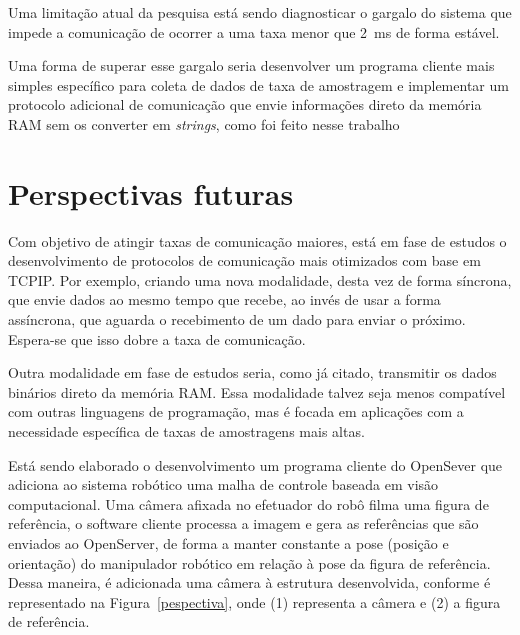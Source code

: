     Uma limitação atual da pesquisa está sendo diagnosticar o gargalo do sistema que impede a comunicação de ocorrer a uma taxa menor que \SI{2}{\milli\second} de forma estável.
    
    Uma forma de superar esse gargalo seria desenvolver um programa cliente mais simples específico para coleta de dados de taxa de amostragem e implementar um protocolo adicional de comunicação que envie informações direto da memória RAM sem os converter em \textit{strings}, como foi feito nesse trabalho
    
    \section{Perspectivas futuras}
        
        Com objetivo de atingir taxas de comunicação maiores, está em fase de estudos o desenvolvimento de protocolos de comunicação mais otimizados com base em \ac{TCPIP}. Por exemplo, criando uma nova modalidade, desta vez de forma síncrona, que envie dados ao mesmo tempo que recebe, ao invés de usar a forma assíncrona, que aguarda o recebimento de um dado para enviar o próximo. Espera-se que isso dobre a taxa de comunicação.
        
        Outra modalidade em fase de estudos seria, como já citado, transmitir os dados binários direto da memória RAM. Essa modalidade talvez seja menos compatível com outras linguagens de programação, mas é focada em aplicações com a necessidade específica de taxas de amostragens mais altas. 
        
        Está sendo elaborado o desenvolvimento um programa cliente do OpenSever que adiciona ao sistema robótico uma malha de controle baseada em visão computacional. Uma câmera afixada no efetuador do robô filma uma figura de referência, o software cliente processa a imagem e gera as referências que são enviados ao OpenServer, de forma a manter constante a pose (posição e orientação) do manipulador robótico em relação à pose da figura de referência. Dessa maneira, é adicionada uma câmera à estrutura desenvolvida, conforme é representado na Figura~\ref{pespectiva}, onde (1) representa a câmera e (2) a figura de referência.
    
